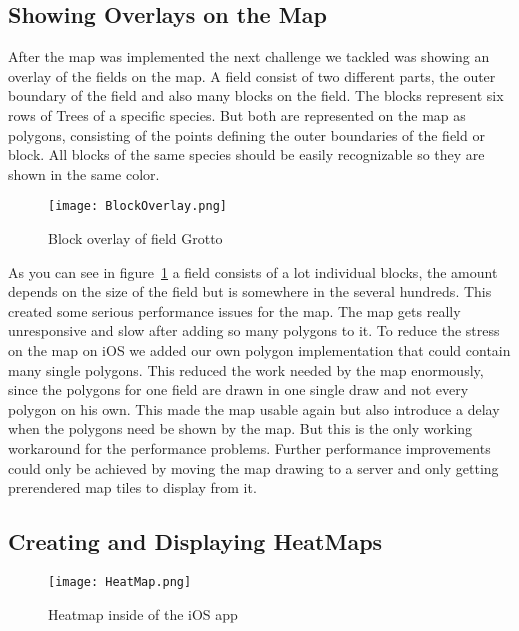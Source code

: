 \subsection{Showing Overlays on the Map}

After the map was implemented the next challenge we tackled was showing an overlay of the fields on the map. A field consist of two different parts, the outer boundary of the field and also many blocks on the field. The blocks represent six rows of Trees of a specific species. But both are represented on the map as polygons, consisting of the points defining the outer boundaries of the field or block. All blocks of the same species should be easily recognizable so they are shown in the same color. 

\begin{figure}[h]
		\centering
		\texttt{[image: BlockOverlay.png]}
		\caption{Block overlay of field Grotto\label{fig:BlockOverlay}}
\end{figure}


As you can see in figure~\ref{fig:BlockOverlay} a field consists of a lot individual blocks, the amount depends on the size of the field but is somewhere in the several hundreds. This created some serious performance issues for the map. The map gets really unresponsive and slow after adding so many \glspl{polygon} to it. To reduce the stress on the map on iOS we added our own \gls{polygon} implementation that could contain many single \glspl{polygon}. This reduced the work needed by the map enormously, since the polygons for one field are drawn in one single draw and not every \gls{polygon} on his own. This made the map usable again but also introduce a delay when the polygons need be shown by the map. But this is the only working workaround for the performance problems. Further performance improvements could only be achieved by moving the map drawing to a server and only getting prerendered map tiles to display from it.

\subsection{Creating and Displaying HeatMaps}

\begin{figure}[h]
		\centering
		\texttt{[image: HeatMap.png]}
		\caption{Heatmap inside of the iOS app\label{fig:Heatmap}}

\end{figure}

